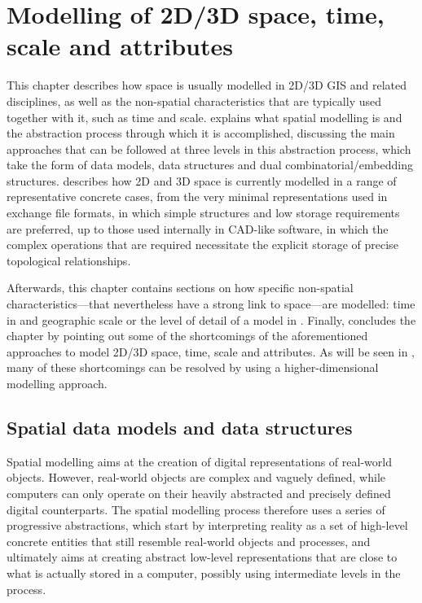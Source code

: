 
\chapter{Modelling of 2D/3D space, time, scale and attributes}
\label{ch:modelling-background}

This chapter describes how space is usually modelled in 2D/3D GIS and related disciplines, as well as the non-spatial characteristics that are typically used together with it, such as time and scale.
 explains what spatial modelling is and the abstraction process through which it is accomplished, discussing the main approaches that can be followed at three levels in this abstraction process, which take the form of data models, data structures and dual combinatorial/embedding structures.
 describes how 2D and 3D space is currently modelled in a range of representative concrete cases, from the very minimal representations used in exchange file formats, in which simple structures and low storage requirements are preferred, up to those used internally in CAD-like software, in which the complex operations that are required necessitate the explicit storage of precise topological relationships.

Afterwards, this chapter contains sections on how specific non-spatial characteristics---that nevertheless have a strong link to space---are modelled: time in  and geographic scale or the level of detail of a model in .
Finally,  concludes the chapter by pointing out some of the shortcomings of the aforementioned approaches to model 2D/3D space, time, scale and attributes.
As will be seen in , many of these shortcomings can be resolved by using a higher-dimensional modelling approach.

\section{Spatial data models and data structures}
\label{se:spatial-modelling}

Spatial modelling aims at the creation of digital representations of real-world objects.
However, real-world objects are complex and vaguely defined, while computers can only operate on their heavily abstracted and precisely defined digital counterparts.
The spatial modelling process therefore uses a series of progressive abstractions, which start by interpreting reality as a set of high-level concrete entities that still resemble real-world objects and processes, and ultimately aims at creating abstract low-level representations that are close to what is actually stored in a computer, possibly using intermediate levels in the process.

